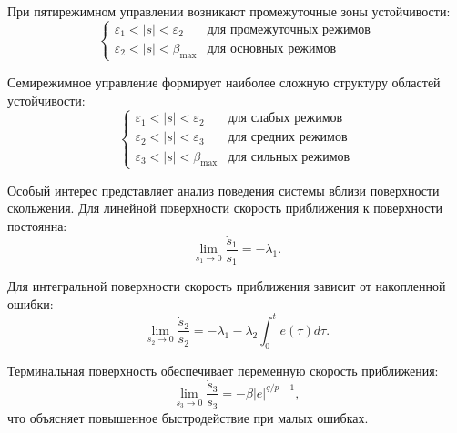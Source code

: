 При пятирежимном управлении возникают промежуточные зоны устойчивости:
\begin{equation}
	\begin{cases}
		\varepsilon_1 < |s| < \varepsilon_2      & \text{для промежуточных режимов} \\
		\varepsilon_2 < |s| < \beta_{\text{max}} & \text{для основных режимов}
	\end{cases}
\end{equation}

Семирежимное управление формирует наиболее сложную структуру областей устойчивости:
\begin{equation}
	\begin{cases}
		\varepsilon_1 < |s| < \varepsilon_2      & \text{для слабых режимов}  \\
		\varepsilon_2 < |s| < \varepsilon_3      & \text{для средних режимов} \\
		\varepsilon_3 < |s| < \beta_{\text{max}} & \text{для сильных режимов}
	\end{cases}
\end{equation}

Особый интерес представляет анализ поведения системы вблизи поверхности скольжения.
Для линейной поверхности скорость приближения к поверхности постоянна:
\begin{equation}
	\lim_{s_1 \to 0} \frac{\dot{s}_1}{s_1} = -\lambda_1.
\end{equation}

Для интегральной поверхности скорость приближения зависит от накопленной ошибки:
\begin{equation}
	\lim_{s_2 \to 0} \frac{\dot{s}_2}{s_2} = -\lambda_1 - \lambda_2\int_0^t e(\tau)d\tau.
\end{equation}

Терминальная поверхность обеспечивает переменную скорость приближения:
\begin{equation}
	\lim_{s_3 \to 0} \frac{\dot{s}_3}{s_3} = -\beta|e|^{q/p-1},
\end{equation}
что объясняет повышенное быстродействие при малых ошибках.